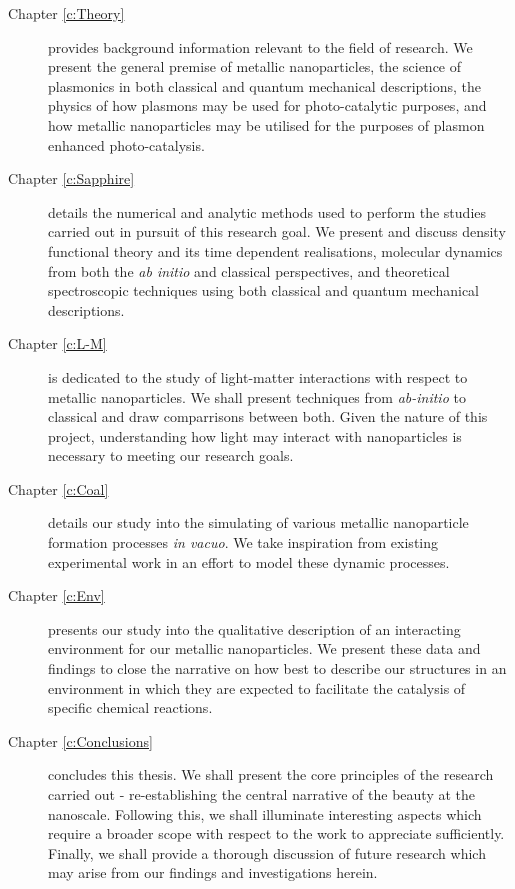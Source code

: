 \begin{description}

  \item[Chapter \ref{c:Theory}] provides background information relevant to the field of research. We present the general premise of metallic nanoparticles, the science of plasmonics in both classical and quantum mechanical descriptions, the physics of how plasmons may be used for photo-catalytic purposes, and how metallic nanoparticles may be utilised for the purposes of plasmon enhanced photo-catalysis.
  
  \item[Chapter \ref{c:Sapphire}] details the numerical and analytic methods used to perform the studies carried out in pursuit of this research goal. We present and discuss density functional theory and its time dependent realisations, molecular dynamics from both the \textit{ab initio} and classical perspectives, and theoretical spectroscopic techniques using both classical and quantum mechanical descriptions.
  
  \item[Chapter \ref{c:L-M}] is dedicated to the study of light-matter interactions with respect to metallic nanoparticles. We shall present techniques from \textit{ab-initio} to classical and draw comparrisons between both. Given the nature of this project, understanding how light may interact with nanoparticles is necessary to meeting our research goals. 
  
  \item[Chapter \ref{c:Coal}] details our study into the simulating of various metallic nanoparticle formation processes \textit{in vacuo}. We take inspiration from existing experimental work in an effort to model these dynamic processes. 
  
  \item[Chapter \ref{c:Env}] presents our study into the qualitative description of an interacting environment for our metallic nanoparticles. We present these data and findings to close the narrative on how best to describe our structures in an environment in which they are expected to facilitate the catalysis of specific chemical reactions.
  
  \item[Chapter \ref{c:Conclusions}] concludes this thesis. We shall present the core principles of the research carried out - re-establishing the central narrative of the beauty at the nanoscale. Following this, we shall illuminate interesting aspects which require a broader scope with respect to the work to appreciate sufficiently. Finally, we shall provide a thorough discussion of future research which may arise from our findings and investigations herein.
  
\end{description}



